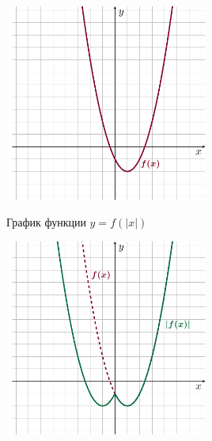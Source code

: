 \documentclass[10pt, a4paper]{article}
\begin{document}
\begin{enumerate}
\begin{minipage}[t]{0.45\textwidth}
\begin{center}
			\includegraphics[align=t, width=0.5\textwidth]{../graphs/graph_18/graph_18}
		\end{center}
	\end{minipage}
	\begin{minipage}[t]{0.45\textwidth}
		\begin{center}
			График функции $y=f(|x|)$\smallskip
			
			\includegraphics[align=t, width=0.5\textwidth]{../graphs/graph_19/graph_19}
		\end{center}
	\end{minipage}
\end{enumerate}
\end{document}
